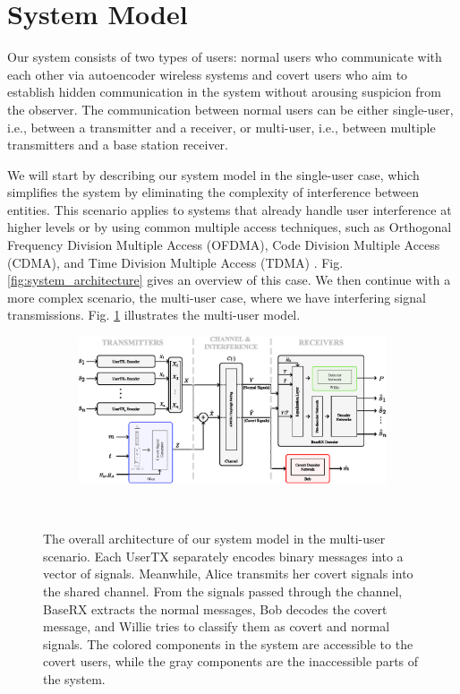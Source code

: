 \section{System Model}
\label{s:model}
Our system consists of two types of users: normal users who communicate with each other via autoencoder wireless systems and covert users who aim to establish hidden communication in the system without arousing suspicion from the observer. The communication between normal users can be either single-user, i.e., between a transmitter and a receiver, or multi-user, i.e., between multiple transmitters and a base station receiver.

We will start by describing our system model in the single-user case, which simplifies the system by eliminating the complexity of interference between entities. This scenario applies to systems that already handle user interference at higher levels or by using common multiple access techniques, such as Orthogonal Frequency Division Multiple Access (OFDMA), Code Division Multiple Access (CDMA), and Time Division Multiple Access (TDMA) \cite{WALRAND2000305}. Fig. \ref{fig:system_architecture} gives an overview of this case. We then continue with a more complex scenario, the multi-user case, where we have interfering signal transmissions. Fig. \ref{fig:multi_system_architecture} illustrates the multi-user model.

\begin{figure}[thp]
	\center
	\begin{subfigure}{0.7\textwidth}
		\includegraphics[width=\linewidth]{figs/multi_system_architecture}
	\end{subfigure}
	\\
	\caption{The overall architecture of our system model in the multi-user scenario. Each UserTX separately encodes binary messages into a vector of signals. Meanwhile, Alice transmits her covert signals into the shared channel. From the signals passed through the channel, BaseRX extracts the normal messages, Bob decodes the covert message, and Willie tries to classify them as covert and normal signals. The colored components in the system are accessible to the covert users, while the gray components are the inaccessible parts of the system.}
	\label{fig:multi_system_architecture}
\end{figure}


